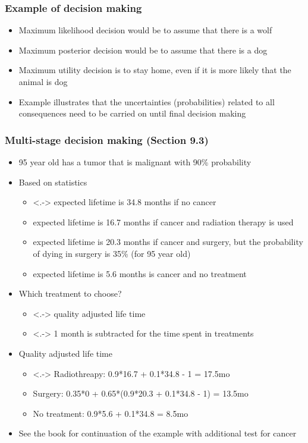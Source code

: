 \documentclass[10pt,handout]{beamer}
\begin{document}
\begin{frame}

\frametitle{Example of decision making}

  \begin{itemize}
  \item<+-> Maximum likelihood decision would be to assume that there is a wolf
  \pause
  \item<+-> Maximum posterior decision would be to assume that there is a dog
  \pause
  \item<+-> Maximum utility decision is to stay home, even if it is more likely that the animal is dog
    \pause
  \item<+-> Example illustrates that the uncertainties (probabilities)
    related to all consequences need to be carried on until final
    decision making
  \end{itemize}

\end{frame}



\begin{frame}

\frametitle{Multi-stage decision making (Section 9.3)}

  \begin{itemize}
  \item<+-> 95 year old has a tumor that is malignant with 90\% probability
  \item<+-> Based on statistics
    \begin{itemize}
    \item<.-> expected lifetime is 34.8 months if no cancer
    \item<+-> expected lifetime is 16.7 months if cancer and radiation therapy is used
    \item<+-> expected lifetime is 20.3 months if cancer and surgery, but the probability of dying in surgery is 35\% (for 95 year old)
    \item<+-> expected lifetime is 5.6 months is cancer and no treatment
    \end{itemize}
  \item<+-> Which treatment to choose?
    \begin{itemize}
    \item<.-> quality adjusted life time
    \item<.-> 1 month is subtracted for the time spent in treatments
    \end{itemize}
   \item<+-> Quality adjusted life time
    \begin{itemize}
    \item<.-> Radiothreapy: 0.9*16.7 + 0.1*34.8 - 1 = 17.5mo
    \item<+-> Surgery: 0.35*0 + 0.65*(0.9*20.3 + 0.1*34.8 - 1) = 13.5mo
    \item<+-> No treatment: 0.9*5.6 + 0.1*34.8 = 8.5mo
    \end{itemize}
  \item<+-> See the book for continuation of the example with
    additional test for cancer
\end{itemize}

\end{frame}
\end{document}
